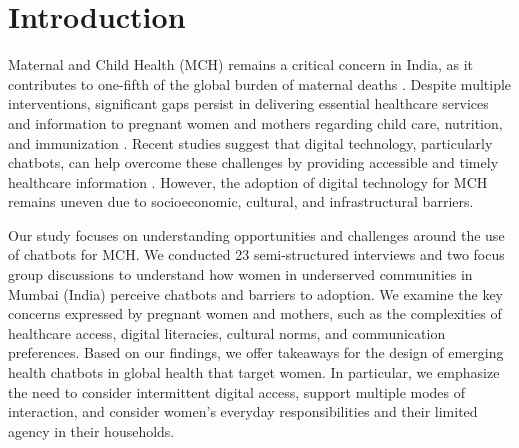 
\section{Introduction}

Maternal and Child Health (MCH) remains a critical concern in India, as it contributes to one-fifth of the global burden of maternal deaths \cite{b1}. Despite multiple interventions, significant gaps persist in delivering essential healthcare services and information to pregnant women and mothers regarding child care, nutrition, and immunization \cite{b2}. 
Recent studies suggest that digital technology, particularly chatbots, can help overcome these challenges by providing accessible and timely healthcare information \cite{b6,b7,22}. However, the adoption of digital technology for MCH remains uneven due to socioeconomic, cultural, and infrastructural barriers.

Our study focuses on understanding opportunities and challenges around the use of chatbots for MCH. 
We conducted 23 semi-structured interviews and two focus group discussions to understand how women in underserved communities in Mumbai (India) perceive chatbots and barriers to adoption. We examine the key concerns expressed by pregnant women and mothers, such as the complexities of healthcare access, digital literacies, cultural norms, and communication preferences. 
Based on our findings, we offer takeaways for the design of emerging health chatbots in global health that target women. In particular, we emphasize the need to consider intermittent digital access, support multiple modes of interaction, and consider women's everyday responsibilities and their limited agency in their households.



